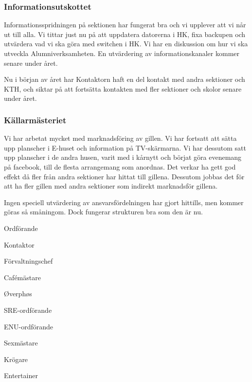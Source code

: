 \documentclass[../_main/handlingar.tex]{subfiles}
\begin{document}


\subsubsection*{Informationsutskottet}
Informationsspridningen på sektionen har fungerat bra och vi upplever att vi når ut till alla. Vi tittar just nu på att uppdatera datorerna i HK, fixa backupen och utvärdera vad vi ska göra med switchen i HK. Vi har en diskussion om hur vi ska utveckla Alumniverksamheten. En utvärdering av informationskanaler kommer senare under året.

Nu i början av året har Kontaktorn haft en del kontakt med andra sektioner och KTH, och siktar på att fortsätta kontakten med fler sektioner och skolor senare under året.

\subsubsection*{Källarmästeriet}
Vi har arbetat mycket med marknadsföring av gillen. Vi har fortsatt att sätta upp planscher i E-huset och information på TV-skärmarna. Vi har dessutom satt upp planscher i de andra husen, varit med i kårnytt och börjat göra evenemang på facebook, till de flesta arrangemang som anordnas. Det verkar ha gett god effekt då fler från andra sektioner har hittat till gillena. Dessutom jobbas det för att ha fler gillen med andra sektioner som indirekt marknadsför gillena.

Ingen speciell utvärdering av ansvarsfördelningen har gjort hittills, men kommer göras så småningom. Dock fungerar strukturen bra som den är nu.

\newpage
\begin{signatures}{10}
    \mvh
    \signature{Fredrik Peterson}{Ordförande}
    \signature{Erik Månsson}{Kontaktor}
    \signature{Anders Nilsson}{Förvaltningschef}
    \signature{Stephanie Mirsky}{Cafémästare}
    \signature{Molly Rusk}{Øverphøs}
    \signature{Johan Persson}{SRE-ordförande}
    \signature{Johannes Koch}{ENU-ordförande}
    \signature{Martin Gemborn Nilsson}{Sexmästare}
    \signature{Malin Lindström}{Krögare}
    \signature{Dalia Khairallah}{Entertainer}
\end{signatures}
\end{document}
